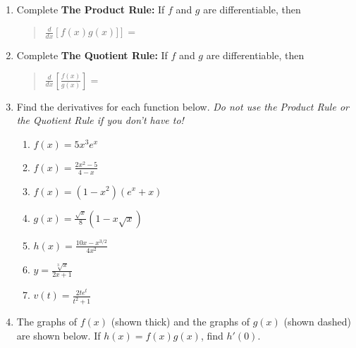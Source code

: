\documentclass[11pt,fleqn]{article}
\begin{document}
\setlength{\parindent}{0cm}
\renewcommand{\headrulewidth}{0pt}
\newcommand{\blank}[1]{\rule{#1}{0.75pt}}
\renewcommand{\d}{\displaystyle}
\vspace*{-0.7in}
\begin{center}
 {\large{ }}
\end{center}
\begin{enumerate}

\item Complete \textbf{The Product Rule:} If $f$ and $g$ are differentiable, then 
\begin{quote}  $\d{\frac{d}{dx} \left[f(x) g(x)]\right] =} $ \end{quote}
\vspace{.2in}

\item Complete \textbf{The Quotient Rule:}  If $f$ and $g$ are differentiable, then
\begin{quote} 
$\frac{d}{dx} \left[ \frac{f(x)}{g(x)} \right] = $ \end{quote}
\vspace{.2in}
\item Find the derivatives for each function below. \emph{Do not use the Product Rule or the Quotient Rule  if you don't have to!}
	\begin{enumerate}
	\item $\d{f(x)=5x^3e^x}$
	\vfill
	\item $\d{f(x)=\frac{2x^2-5}{4-x}}$
	\vfill
	\item $\d{f(x)=(1-x^2)(e^x+x)}$
	\vfill
	\item $\d{g(x)=\frac{\sqrt{x}}{8}(1-x\sqrt{x})}$
	\vfill
	
	\newpage
	\item $\d{h(x)=\frac{10x-x^{3/2}}{4x^2}}$
	\vfill
	\item $\d{y=\frac{\sqrt[3]{x}}{2x+1}}$
	\vfill
	\item $\d{v(t)=\frac{2te^t}{t^2+1}}$
	\vfill
	\end{enumerate}
\item   The graphs of $f(x)$ (shown thick) and the graphs of $g(x)$ (shown dashed) are shown below. If $h(x) = f(x)g(x)$, find $h'(0)$.

  \begin{flushleft}


\end{flushleft}
\end{enumerate}
\end{document}

